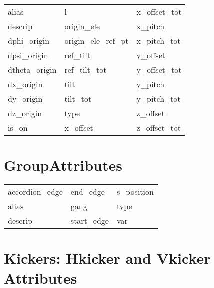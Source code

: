  \begin{tabular}{lll} \toprule
alias                       & l                           & x_offset_tot                \\
descrip                     & origin_ele                  & x_pitch                     \\
dphi_origin                 & origin_ele_ref_pt           & x_pitch_tot                 \\
dpsi_origin                 & ref_tilt                    & y_offset                    \\
dtheta_origin               & ref_tilt_tot                & y_offset_tot                \\
dx_origin                   & tilt                        & y_pitch                     \\
dy_origin                   & tilt_tot                    & y_pitch_tot                 \\
dz_origin                   & type                        & z_offset                    \\
is_on                       & x_offset                    & z_offset_tot                \\
 \bottomrule
 \end{tabular}
 \vfill
 
 \section{GroupAttributes}
 \label{s:list.group}
 
 \begin{tabular}{lll} \toprule
accordion_edge              & end_edge                    & s_position                  \\
alias                       & gang                        & type                        \\
descrip                     & start_edge                  & var                         \\
 \bottomrule
 \end{tabular}
 \vfill
 
 \section{Kickers: Hkicker and Vkicker Attributes}
 \label{s:list.hvkicker}
 
